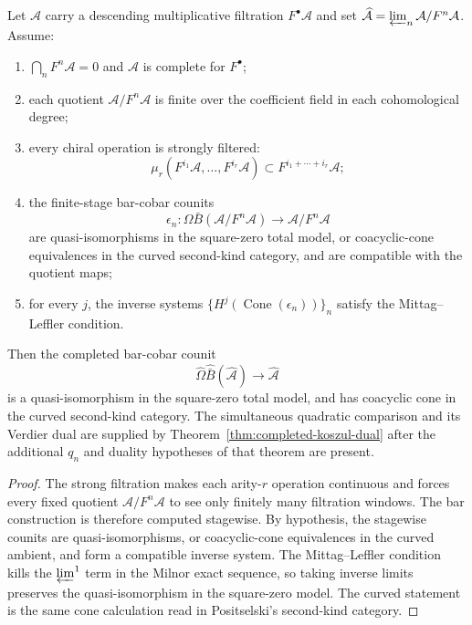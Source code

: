\begin{theorem}\label{thm:completion-convergence-criteria}
Let $\mathcal{A}$ carry a descending multiplicative filtration
$F^\bullet\mathcal A$ and set
$\widehat{\mathcal A}=\varprojlim_n\mathcal A/F^n\mathcal A$.
Assume:
\begin{enumerate}
\item $\bigcap_n F^n\mathcal A=0$ and $\mathcal A$ is complete for
 $F^\bullet$;
\item each quotient $\mathcal A/F^n\mathcal A$ is finite over the
 coefficient field in each cohomological degree;
\item every chiral operation is strongly filtered:
 \[
 \mu_r(F^{i_1}\mathcal A,\ldots,F^{i_r}\mathcal A)
 \subset F^{i_1+\cdots+i_r}\mathcal A;
 \]
\item the finite-stage bar-cobar counits
 \[
 \epsilon_n\colon
 \Omega\bar B(\mathcal A/F^n\mathcal A)\to
 \mathcal A/F^n\mathcal A
 \]
 are quasi-isomorphisms in the square-zero
 total model, or coacyclic-cone equivalences in the curved
 second-kind category, and are compatible with the quotient maps;
\item for every $j$, the inverse systems
 $\{H^j(\operatorname{Cone}(\epsilon_n))\}_n$ satisfy the
 Mittag--Leffler condition.
\end{enumerate}
Then the completed bar-cobar counit
\[
\widehat\Omega\widehat{\bar B}(\widehat{\mathcal A})\longrightarrow
\widehat{\mathcal A}
\]
is a quasi-isomorphism in the square-zero total model, and has
coacyclic cone in the curved second-kind category.  The simultaneous
quadratic comparison and its Verdier dual are supplied by
Theorem~\ref{thm:completed-koszul-dual} after the additional $q_n$ and
duality hypotheses of that theorem are present.
\end{theorem}

\begin{proof}
The strong filtration makes each arity-$r$ operation continuous and
forces every fixed quotient $\mathcal A/F^n\mathcal A$ to see only
finitely many filtration windows. The bar construction is therefore
computed stagewise. By hypothesis, the stagewise counits are
quasi-isomorphisms, or coacyclic-cone equivalences in the curved
ambient, and form a compatible inverse system. The Mittag--Leffler
condition kills the $\varprojlim^1$ term in the Milnor exact sequence,
so taking inverse limits preserves the quasi-isomorphism in the
square-zero model. The curved statement is the same cone calculation
read in Positselski's second-kind category.
\end{proof}

